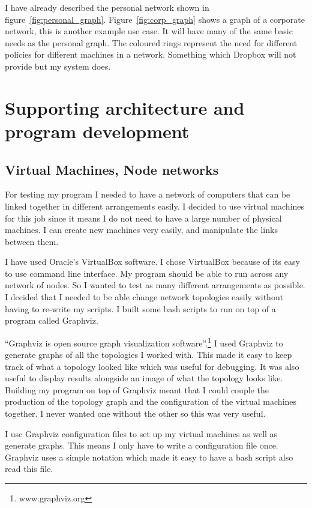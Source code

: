 \documentclass[12pt]{article}
\begin{document}
I have already described the personal network shown in
figure~\ref{fig:personal_graph}. Figure~\ref{fig:corp_graph}
shows a graph of a corporate network, this
is another example use case. It will have many of the same
basic needs as the personal graph. The coloured rings represent
the need for different policies for different machines in a network.
Something which Dropbox will not provide but my system does.


\section{Supporting architecture and program development}
\subsection{Virtual Machines, Node networks}
For testing my program I needed to have a network
of computers that can be linked together in different
arrangements easily. I decided to use virtual machines for
this job since it means I do not need to have a large number
of physical machines.  I can create new machines very easily, and manipulate the
links between them.

I have used Oracle's VirtualBox software. I chose
VirtualBox because of its easy to use command
line interface.
My program should be able to run across
any network of nodes. So I wanted to test
as many different arrangements as possible.
I decided that I needed to be able change network
topologies easily without having to re-write
my scripts. I built some bash scripts to run on top
of a program called Graphviz.

``Graphviz is open source graph visualization software''.\footnote{www.graphviz.org}
I used Graphviz to generate graphs of all the topologies I worked
with. This made it easy to keep track of what a topology looked like
which was useful for debugging. It was also useful to display results
alongside an image of what the topology looks like. Building my
program on top of Graphviz meant that I could couple the production
of the topology graph and the configuration of the virtual machines
together. I never wanted one without the other so this was very useful.

I use Graphviz configuration files to set up my virtual machines
as well as generate graphs. This means I only have to write a configuration
file once. Graphviz uses a simple notation which made it easy to have
a bash script also read this file.
\end{document}
